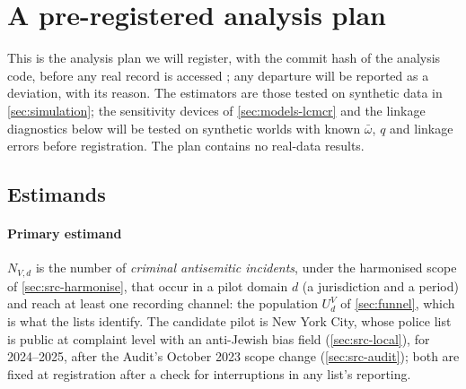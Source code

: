 \section{A pre-registered analysis plan}\label{sec:plan}

This is the analysis plan we will register, with the commit hash of the analysis code, before any real record is accessed \citep{nosek2018}; any departure will be reported as a deviation, with its reason. The estimators are those tested on synthetic data in \cref{sec:simulation}; the sensitivity devices of \cref{sec:models-lcmcr} and the linkage diagnostics below will be tested on synthetic worlds with known $\bar\omega$, $q$ and linkage errors before registration. The plan contains no real-data results.

\subsection{Estimands}\label{sec:plan-estimands}

\paragraph{Primary estimand}
$N_{V,d}$ is the number of \emph{criminal antisemitic incidents}, under the harmonised scope of \cref{sec:src-harmonise}, that occur in a pilot domain $d$ (a jurisdiction and a period) and reach at least one recording channel: the population $U_d^V$ of \cref{sec:funnel}, which is what the lists identify. The candidate pilot is New York City, whose police list is public at complaint level with an anti-Jewish bias field (\cref{sec:src-local}), for 2024--2025, after the Audit's October 2023 scope change (\cref{sec:src-audit}); both are fixed at registration after a check for interruptions in any list's reporting.

